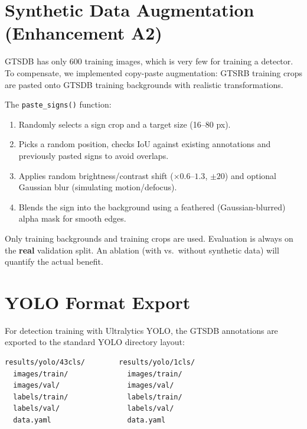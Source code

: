 \documentclass[12pt,a4paper]{article}
\begin{document}
\section{Synthetic Data Augmentation (Enhancement A2)}
\label{sec:synth}

GTSDB has only 600 training images, which is very few for training a detector. To compensate, we implemented copy-paste augmentation: GTSRB training crops are pasted onto GTSDB training backgrounds with realistic transformations.

The \texttt{paste\_signs()} function:
\begin{enumerate}[leftmargin=2em]
  \item Randomly selects a sign crop and a target size (16--80 px).
  \item Picks a random position, checks IoU against existing annotations and previously pasted signs to avoid overlaps.
  \item Applies random brightness/contrast shift ($\times 0.6$--$1.3$, $\pm 20$) and optional Gaussian blur (simulating motion/defocus).
  \item Blends the sign into the background using a feathered (Gaussian-blurred) alpha mask for smooth edges.
\end{enumerate}

\begin{notebox}
Only training backgrounds and training crops are used. Evaluation is always on the \textbf{real} validation split. An ablation (with vs.\ without synthetic data) will quantify the actual benefit.
\end{notebox}

\section{YOLO Format Export}
\label{sec:yolo}

For detection training with Ultralytics YOLO, the GTSDB annotations are exported to the standard YOLO directory layout:

\begin{lstlisting}[caption={YOLO directory structure.}]
results/yolo/43cls/        results/yolo/1cls/
  images/train/              images/train/
  images/val/                images/val/
  labels/train/              labels/train/
  labels/val/                labels/val/
  data.yaml                  data.yaml
\end{lstlisting}
\end{document}
